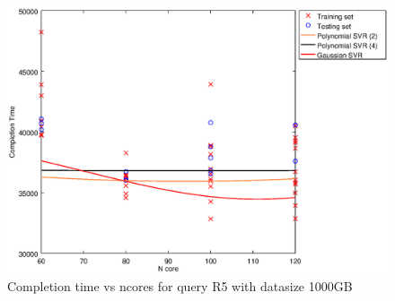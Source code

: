 
\begin {figure}[hbtp]
\centering
\includegraphics[width=\textwidth]{output/R5_1000_LINEAR_NCORE/plot_R5_1000_bestmodels.eps}
\caption{Completion time vs ncores for query R5 with datasize 1000GB}
\label{fig:coreonly_linear_R5_1000}
\end {figure}
